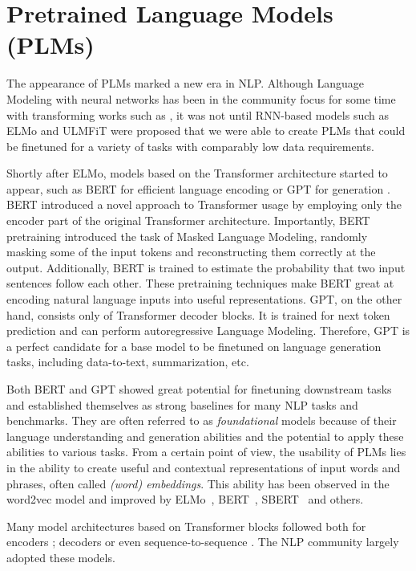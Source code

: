 \section{Pretrained Language Models (PLMs)}
\label{background:plms}
The appearance of PLMs marked a new era in NLP.
Although Language Modeling with neural networks has been in the community focus for some time with transforming works such as  \citet{mikolov2010recurrent,mikolov2013distributed}, it was not until RNN-based models such as ELMo \cite{peters-etal-2018-deep} and ULMFiT \cite{howard-ruder-2018-universal} were proposed that we were able to create PLMs that could be finetuned for a variety of tasks with comparably low data requirements.

Shortly after ELMo, models based on the Transformer architecture started to appear, such as BERT for efficient language encoding \cite{devlin2019} or GPT for generation \cite{radford2018improving}.
BERT introduced a novel approach to Transformer usage by employing only the encoder part of the original Transformer architecture.
Importantly, BERT pretraining introduced the task of Masked Language Modeling, randomly masking some of the input tokens and reconstructing them correctly at the output.
Additionally, BERT is trained to estimate the probability that two input sentences follow each other.
These pretraining techniques make BERT great at encoding natural language inputs into useful representations.
GPT, on the other hand, consists only of Transformer decoder blocks.
It is trained for next token prediction and can perform autoregressive Language Modeling.
Therefore, GPT is a perfect candidate for a base model to be finetuned on language generation tasks, including data-to-text, summarization, etc.


Both BERT and GPT showed great potential for finetuning downstream tasks and established themselves as strong baselines for many NLP tasks and benchmarks.
They are often referred to as \emph{foundational} models because of their language understanding and generation abilities and the potential to apply these abilities to various tasks.
From a certain point of view, the usability of PLMs lies in the ability to create useful and contextual representations of input words and phrases, often called \emph{(word) embeddings}.
This ability has been observed in the word2vec model \cite{mikolov2013distributed} and improved by ELMo~\cite{peters-etal-2018-deep}, BERT~\cite{devlin2019}, SBERT~\cite{reimers2019sentence} and others.

Many model architectures based on Transformer blocks followed both for encoders \cite{liu2019roberta,reimers2019sentence}; decoders \cite{radford2019language,brown2020language} or even sequence-to-sequence \cite{raffel2020exploring,lewis-etal-2020-bart}.
The NLP community largely adopted these models.


